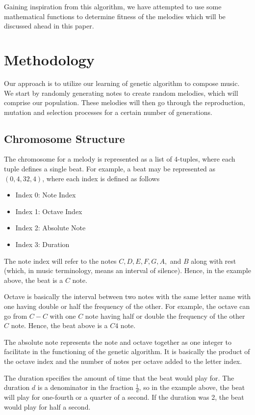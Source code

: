 \documentclass[conference]{IEEEtran}
\begin{document}
Gaining inspiration from this algorithm, we have attempted to use some mathematical functions to determine fitness of the melodies which will be discussed ahead in this paper.

\section{Methodology}
Our approach is to utilize our learning of genetic algorithm to compose music. We start by randomly generating notes to create random melodies, which will comprise our population. These melodies will then go through the reproduction, mutation and selection processes for a certain number of generations.

\subsection{Chromosome Structure}
The chromosome for a melody is represented as a list of 4-tuples, where each tuple defines a single beat. For example, a beat may be represented as $(0, 4, 32, 4)$, where each index is defined as follows
\begin{itemize}
	\item Index 0: Note Index
	\item Index 1: Octave Index
	\item Index 2: Absolute Note
	\item Index 3: Duration
\end{itemize}

The note index will refer to the notes $C, D, E, F, G, A,$ and $B$ along with rest (which, in music terminology, means an interval of silence). Hence, in the example above, the beat is a $C$ note.

Octave is basically the interval between two notes with the same letter name with one having double or half the frequency of the other. For example, the octave can go from $C-C$ with one $C$ note having half or double the frequency of the other $C$ note. Hence, the beat above is a $C4$ note.

The absolute note represents the note and octave together as one integer to facilitate in the functioning of the genetic algorithm. It is basically the product of the octave index and the number of notes per octave added to the letter index.

The duration specifies the amount of time that the beat would play for. The duration $d$ is a denominator in the fraction $\frac{1}{d}$, so in the example above, the beat will play for one-fourth or a quarter of a second. If the duration was 2, the beat would play for half a second.
\end{document}
